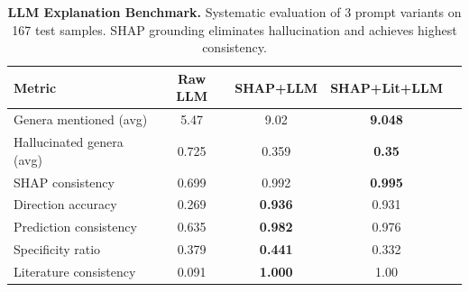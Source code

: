 \begin{table}[t]
\centering
\caption{\textbf{LLM Explanation Benchmark.}
Systematic evaluation of 3 prompt variants on 167 test samples.
SHAP grounding eliminates hallucination and achieves highest consistency.}
\label{tab:llm_benchmark}
\begin{tabular}{lcccc}
\toprule
\textbf{Metric} & \textbf{Raw LLM} & \textbf{SHAP+LLM} & \textbf{SHAP+Lit+LLM} \\
\midrule
  Genera mentioned (avg) & 5.47 & 9.02 & \textbf{9.048} \\
  Hallucinated genera (avg) & 0.725 & 0.359 & \textbf{0.35} \\
  SHAP consistency & 0.699 & 0.992 & \textbf{0.995} \\
  Direction accuracy & 0.269 & \textbf{0.936} & 0.931 \\
  Prediction consistency & 0.635 & \textbf{0.982} & 0.976 \\
  Specificity ratio & 0.379 & \textbf{0.441} & 0.332 \\
  Literature consistency & 0.091 & \textbf{1.000} & 1.00 \\
\bottomrule
\end{tabular}
\end{table}